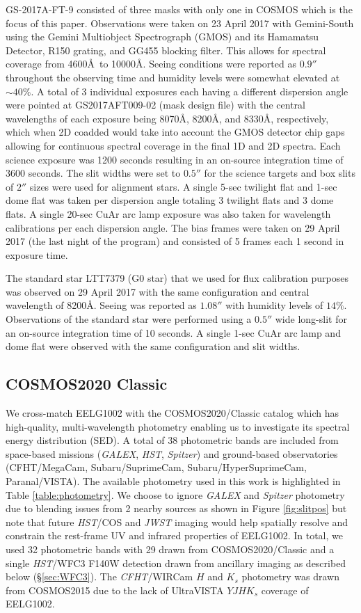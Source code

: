 \documentclass[twocolumn,tight,times,linenumbers]{aastex631}
\begin{document}
		GS-2017A-FT-9 consisted of three masks with only one in COSMOS which is the focus of this paper. Observations were taken on 23 April 2017 with Gemini-South using the Gemini Multiobject Spectrograph (GMOS) and its Hamamatsu Detector, R150 grating, and GG455 blocking filter. This allows for spectral coverage from 4600\AA~to 10000\AA. Seeing conditions were reported as $0.9''$ throughout the observing time and humidity levels were somewhat elevated at $\sim 40\%$. A total of 3 individual exposures each having a different dispersion angle were pointed at GS2017AFT009-02 (mask design file) with the central wavelengths of each exposure being 8070\AA, 8200\AA, and 8330\AA, respectively, which when 2D coadded would take into account the GMOS detector chip gaps allowing for continuous spectral coverage in the final 1D and 2D spectra. Each science exposure was 1200 seconds resulting in an on-source integration time of 3600 seconds. The slit widths were set to $0.5''$ for the science targets and box slits of $2''$ sizes were used for alignment stars. A single 5-sec twilight flat and 1-sec dome flat was taken per dispersion angle totaling 3 twilight flats and 3 dome flats. A single 20-sec CuAr arc lamp exposure was also taken for wavelength calibrations per each dispersion angle. The bias frames were taken on 29 April 2017 (the last night of the program) and consisted of 5 frames each 1 second in exposure time.

		
		The standard star LTT7379 (G0 star) that we used for flux calibration purposes was observed on 29 April 2017 with the same configuration and central wavelength of 8200\AA. Seeing was reported as $1.08''$ with humidity levels of $14\%$. Observations of the standard star were performed using a $0.5''$ wide long-slit for an on-source integration time of 10 seconds. A single 1-sec CuAr arc lamp and dome flat were observed with the same configuration and slit widths.
		
		\subsection{COSMOS2020 Classic}
		We cross-match EELG1002 with the COSMOS2020/Classic catalog \citep{Weaver2022} which has high-quality, multi-wavelength photometry enabling us to investigate its spectral energy distribution (SED). A total of 38 photometric bands are included from space-based missions (\textit{GALEX}, \textit{HST}, \textit{Spitzer}) and ground-based observatories (CFHT/MegaCam, Subaru/SuprimeCam, Subaru/HyperSuprimeCam, Paranal/VISTA). The available photometry used in this work is highlighted in Table \ref{table:photometry}. We choose to ignore \textit{GALEX} and \textit{Spitzer} photometry due to blending issues from 2 nearby sources as shown in Figure \ref{fig:slitpos} but note that future \textit{HST}/COS and \textit{JWST} imaging would help spatially resolve and constrain the rest-frame UV and infrared properties of EELG1002. In total, we used 32 photometric bands with 29 drawn from COSMOS2020/Classic and a single \textit{HST}/WFC3 F140W detection drawn from ancillary imaging as described below (\S\ref{sec:WFC3}). The \textit{CFHT}/WIRCam $H$ and $K_s$ photometry was drawn from COSMOS2015 \citep{Laigle2016} due to the lack of UltraVISTA $YJHK_s$ coverage of EELG1002. 
		
\end{document}

